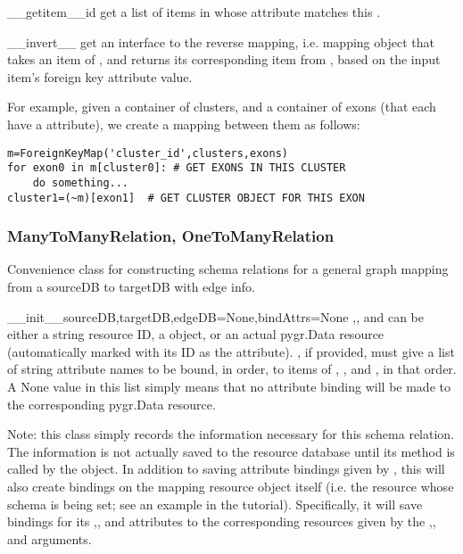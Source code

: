 \documentclass{howto}
\begin{document}
\begin{funcdesc}{__getitem__}{id}
  get a list of items in  whose attribute matches this .
\end{funcdesc}

\begin{funcdesc}{__invert__}{}
  get an interface to the reverse mapping, i.e. mapping object that takes an
  item of , and returns its corresponding item from ,
  based on the input item's foreign key attribute value.
\end{funcdesc}

For example, given a container of clusters, and a container of exons (that each
have a  attribute), we create a mapping between them as follows:
\begin{verbatim}
m=ForeignKeyMap('cluster_id',clusters,exons)
for exon0 in m[cluster0]: # GET EXONS IN THIS CLUSTER
    do something...
cluster1=(~m)[exon1]  # GET CLUSTER OBJECT FOR THIS EXON
\end{verbatim}


\subsubsection{ManyToManyRelation, OneToManyRelation}
Convenience class for constructing schema relations for
a general graph mapping from a sourceDB to targetDB with edge info.
\begin{funcdesc}{__init__}{sourceDB,targetDB,edgeDB=None,bindAttrs=None}
  ,, and  can be either
  a string resource ID, a  object, or
  an actual pygr.Data resource (automatically marked with its ID
  as the  attribute).
  , if provided, must give a list of string attribute names to be
  bound, in order, to items of , ,
  and , in that order.  A None value in this list simply
  means that no attribute binding will be made to the corresponding
  pygr.Data resource.
\end{funcdesc}
Note: this class simply records the information necessary for this
schema relation.  The information is not actually saved to the resource
database until its  method is called by 
the  object.  In addition to saving attribute
bindings given by , this will also create bindings
on the mapping resource object itself (i.e. the resource whose
schema is being set; see an example in the tutorial).  Specifically,
it will save bindings for its ,,
and  attributes to the corresponding resources
given by the ,,
and  arguments.
\end{document}
